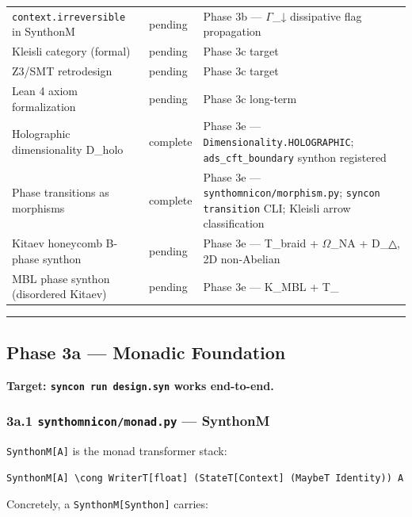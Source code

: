 \documentclass[12pt,a4paper]{article}
\begin{document}
\begin{table}[htbp]
\begin{tabularx}{\textwidth}{>{\centering\arraybackslash}X >{\centering\arraybackslash}X >{\centering\arraybackslash}X}
\texttt{context.irreversible} in SynthonM &  pending & Phase 3b --- $\Gamma$\_↓ dissipative flag propagation \\
Kleisli category (formal) &  pending & Phase 3c target \\
Z3/SMT retrodesign &  pending & Phase 3c target \\
Lean 4 axiom formalization &  pending & Phase 3c long-term \\
Holographic dimensionality D\_holo &  complete & Phase 3e --- \texttt{Dimensionality.HOLOGRAPHIC}; \texttt{ads\_cft\_boundary} synthon registered \\
Phase transitions as morphisms &  complete & Phase 3e --- \texttt{synthomnicon/morphism.py}; \texttt{syncon transition} CLI; Kleisli arrow classification \\
Kitaev honeycomb B-phase synthon &  pending & Phase 3e --- T\_braid + $\Omega$\_NA + D\_△, 2D non-Abelian \\
MBL phase synthon (disordered Kitaev) &  pending & Phase 3e --- K\_MBL + T\_ \\
\bottomrule
\end{tabularx}
\end{table}

\begin{center}
\rule{0.5\textwidth}{0.4pt}
\end{center}

\subsection{Phase 3a --- Monadic Foundation}

\textbf{Target: \texttt{syncon run design.syn} works end-to-end.}

\subsubsection{3a.1 \texttt{synthomnicon/monad.py} --- SynthonM}

\texttt{SynthonM{[}A{]}} is the monad transformer stack:

\begin{lstlisting}
SynthonM[A] \cong WriterT[float] (StateT[Context] (MaybeT Identity)) A
\end{lstlisting}

Concretely, a \texttt{SynthonM{[}Synthon{]}} carries:
\end{document}
